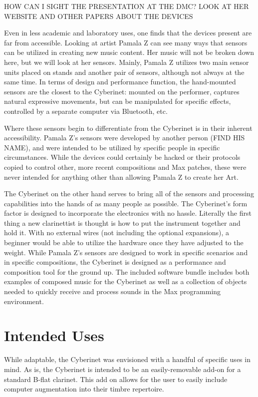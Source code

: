 HOW CAN I SIGHT THE PRESENTATION AT THE DMC? LOOK AT HER WEBSITE AND OTHER PAPERS ABOUT THE DEVICES

Even in less academic and laboratory uses, one finds that the devices present are far from accessible. Looking at artist Pamala Z can see many ways that sensors can be utilized in creating new music content. Her music will not be broken down here, but we will look at her sensors. Mainly, Pamala Z utilizes two main sensor units placed on stands and another pair of sensors, although not always at the same time. In terms of design and performance function, the hand-mounted sensors are the closest to the Cyberinet: mounted on the performer, captures natural expressive movements, but can be manipulated for specific effects, controlled by a separate computer via Bluetooth, etc.

Where these sensors begin to differentiate from the Cyberinet is in their inherent accessibility. Pamala Z's sensors were developed by another person (FIND HIS NAME), and were intended to be utilized by specific people in specific circumstances. While the devices could certainly be hacked or their protocols copied to control other, more recent compositions and Max patches, these were never intended for anything other than allowing Pamala Z to create her Art. 

The Cyberinet on the other hand serves to bring all of the sensors and processing capabilities into the hands of as many people as possible. The Cyberinet's form factor is designed to incorporate the electronics with no hassle. Literally the first thing a new clarinettist is thought is how to put the instrument together and hold it. With no external wires (not including the optional expansions), a beginner would be able to utilize the hardware once they have adjusted to the weight. While Pamala Z's sensors are designed to work in specific scenarios and in specific compositions, the Cyberinet is designed as a performance and composition tool for the ground up. The included software bundle includes both examples of composed music for the Cyberinet as well as a collection of objects needed to quickly receive and process sounds in the Max programming environment. 


\chapter{Intended Uses} %

While adaptable, the Cyberinet was envisioned with a handful of specific uses in mind. As is, the Cyberinet is intended to be an easily-removable add-on for a standard B-flat clarinet. This add on allows for the user to easily include computer augmentation into their timbre repertoire. 

